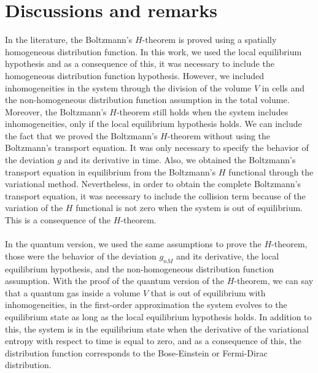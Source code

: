 
\section{Discussions and remarks}\label{sec:disscussion}

In the literature, the Boltzmann's $H$-theorem is proved using a spatially homogeneous distribution function. In this work, we used the local equilibrium hypothesis and as a consequence of this, it was necessary to include the homogeneous distribution function hypothesis. However, we included inhomogeneities in the system through the division of the volume $V$ in cells and the non-homogeneous distribution function assumption in the total volume. Moreover, the Boltzmann's $H$-theorem still holds when the system includes inhomogeneities, only if the local equilibrium hypothesis holds. We can include the fact that we proved the Boltzmann's $H$-theorem without using the Boltzmann's transport equation. It was only necessary to specify the behavior of the deviation $g$ and its derivative in time. Also, we obtained the Boltzmann's transport equation in equilibrium from the Boltzmann's $H$ functional through the variational method. Nevertheless, in order to obtain the complete Boltzmann's transport equation, it was necessary to include the collision term because of the variation of the $H$ functional is not zero when the system is out of equilibrium. This is a consequence of the $H$-theorem.\\
\\
In the quantum version, we used the same assumptions to prove the $H$-theorem, those were the behavior of the deviation $g_{nM}$ and its derivative, the local equilibrium hypothesis, and the non-homogeneous distribution function assumption. With the proof of the quantum version of the $H$-theorem, we can say that a quantum gas inside a volume $V$ that is out of equilibrium with inhomogeneities, in the first-order approximation the system evolves to the equilibrium state as long as the local equilibrium hypothesis holds. In addition to this, the system is in the equilibrium state when the derivative of the variational entropy with respect to time is equal to zero, and as a consequence of this, the distribution function corresponds to the Bose-Einstein or Fermi-Dirac distribution.\\
